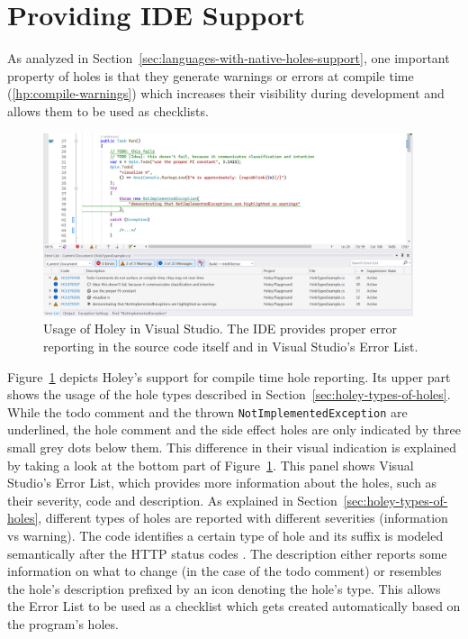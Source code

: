 \section{Providing IDE Support}
\label{sec:providing-ide-support}
As analyzed in Section~\ref{sec:languages-with-native-holes-support}, one important property of holes is that they generate warnings or errors at compile time (\ref{hp:compile-warnings}) which increases their visibility during development and allows them to be used as checklists.
%
\begin{figure}[ht]
    \centering
    \includegraphics[width=0.97\textwidth]{images/ide-reporting}
    \caption{Usage of Holey in Visual Studio. The IDE provides proper error reporting in the source code itself and in Visual Studio's Error List.}
    \label{fig:providing-ide-support}
\end{figure}
%
Figure~\ref{fig:providing-ide-support} depicts Holey's support for compile time hole reporting.
Its upper part shows the usage of the hole types described in Section~\ref{sec:holey-types-of-holes}.
While the todo comment and the thrown \verb|NotImplementedException| are underlined, the hole comment and the side effect holes are only indicated by three small grey dots below them.
This difference in their visual indication is explained by taking a look at the bottom part of Figure~\ref{fig:providing-ide-support}.
This panel shows Visual Studio's Error List, which provides more information about the holes, such as their severity, code and description.
As explained in Section~\ref{sec:holey-types-of-holes}, different types of holes are reported with different severities (information vs warning).
The code identifies a certain type of hole and its suffix is modeled semantically after the HTTP status codes \cite{mozilla_http_2023}.
The description either reports some information on what to change (in the case of the todo comment) or resembles the hole's description prefixed by an icon denoting the hole's type.
This allows the Error List to be used as a checklist which gets created automatically based on the program's holes.


